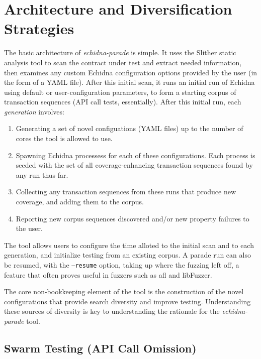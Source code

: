 \documentclass[sigconf]{acmart}
\begin{document}
{\section{Architecture and Diversification Strategies}

The basic architecture of \emph{echidna-parade} is simple.  It uses
the Slither static analysis tool to scan the contract under test and
extract needed information, then examines any custom Echidna
configuration options provided by the user (in the form of a YAML
file).  After this initial scan, it runs an initial run of Echidna
using default or user-configuration parameters, to form a starting
corpus of transaction sequences (API call tests, essentially).  After
this initial run, each \emph{generation} involves:

\begin{enumerate}
  \item Generating a set of novel configuations (YAML files) up to the
    number of cores the tool is allowed to use. 
    \item Spawning Echidna processess for each of these
      configurations.  Each process is seeded with the set of all
      coverage-enhancing transaction sequences found by any run thus far.
      \item Collecting any transaction sequences from these runs that
        produce new coverage, and adding them to the corpus.
        \item Reporting new corpus sequences discovered and/or new property failures to
          the user.
        \end{enumerate}

The tool allows users to configure the time alloted to the initial scan and to each generation, and initialize testing from an existing corpus.  A parade run can also be resumed, with the {\tt --resume} option, taking up where the fuzzing left off, a feature that often proves useful in fuzzers such as afl and libFuzzer.
        
The core non-bookkeeping element of the tool is the construction of the
novel configurations that provide search diversity and improve
testing.  Understanding these sources of diversity is key to
understanding the rationale for the \emph{echidna-parade} tool.

\subsection{Swarm Testing (API Call Omission)}

}
\end{document}
